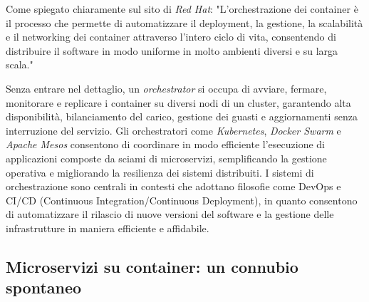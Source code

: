 Come spiegato chiaramente sul sito di \emph{Red Hat}: "L'orchestrazione dei container è il processo che permette di automatizzare il deployment, la gestione, la scalabilità e il networking dei container attraverso l'intero ciclo di vita, consentendo di distribuire il software in modo uniforme in molto ambienti diversi e su larga scala." \cite{RedHat_Orchestration}

Senza entrare nel dettaglio, un \emph{orchestrator} si occupa di avviare, fermare, monitorare e replicare i container su diversi nodi di un cluster, garantendo alta disponibilità, bilanciamento del carico, gestione dei guasti e aggiornamenti senza interruzione del servizio. Gli orchestratori come \emph{Kubernetes}, \emph{Docker Swarm} e \emph{Apache Mesos} consentono di coordinare in modo efficiente l'esecuzione di applicazioni composte da sciami di microservizi, semplificando la gestione operativa e migliorando la resilienza dei sistemi distribuiti.
I sistemi di orchestrazione sono centrali in contesti che adottano filosofie come DevOps e CI/CD (Continuous Integration/Continuous Deployment), in quanto consentono di automatizzare il rilascio di nuove versioni del software e la gestione delle infrastrutture in maniera efficiente e affidabile.

\subsection{Microservizi su container: un connubio spontaneo}





